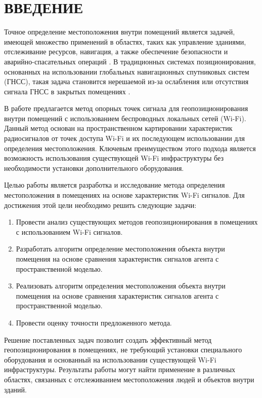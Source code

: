 \chapter*{ВВЕДЕНИЕ}

Точное определение местоположения внутри помещений является задачей, имеющей множество применений в областях, таких как управление зданиями, отслеживание ресурсов, навигация, а также обеспечение безопасности и аварийно-спасательных операций \cite{basebook}. В традиционных системах позиционирования, основанных на использовании глобальных навигационных спутниковых систем (ГНСС), такая задача становится нерешаемой из-за ослабления или отсутствия сигнала ГНСС в закрытых помещениях \cite{GPSdrawbacks}.

В работе предлагается метод опорных точек сигнала для геопозиционирования внутри помещений с использованием беспроводных локальных сетей (Wi-Fi). Данный метод основан на пространственном картировании характеристик радиосигналов от точек доступа Wi-Fi и их последующем использовании для определения местоположения. Ключевым преимуществом этого подхода является возможность использования существующей Wi-Fi инфраструктуры без необходимости установки дополнительного оборудования.

Целью работы является разработка и исследование метода определения местоположения в помещениях на основе характеристик Wi-Fi сигналов. Для достижения этой цели необходимо решить следующие задачи:

\begin{enumerate}
    \item Провести анализ существующих методов геопозиционирования в помещениях с использованием Wi-Fi сигналов.
    \item Разработать алгоритм определение местоположения объекта внутри помещения на основе сравнения характеристик сигналов агента с пространственной моделью.
    \item Реализовать алгоритм определения местоположения объекта внутри помещения на основе сравнения характеристик сигналов агента с пространственной моделью.
    \item Провести оценку точности предложенного метода.
\end{enumerate}

Решение поставленных задач позволит создать эффективный метод геопозиционирования в помещениях, не требующий установки специального оборудования и основанный на использовании существующей Wi-Fi инфраструктуры. Результаты работы могут найти применение в различных областях, связанных с отслеживанием местоположения людей и объектов внутри зданий.
